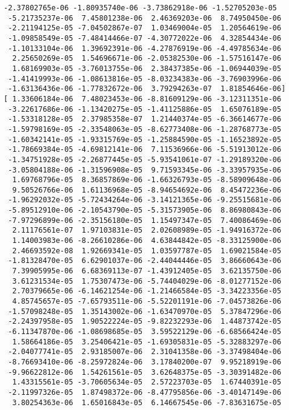 \documentclass[11pt]{article}
\begin{document}
\begin{Verbatim}[commandchars=\\\{\}]
 -2.37802765e-06 -1.80935740e-06 -3.73862918e-06 -1.52705203e-05
 -5.21735237e-06  7.45801238e-06  2.46369203e-06  8.74950450e-06
 -2.21194125e-05 -7.04502867e-07  1.03469004e-05  1.20564619e-06
 -1.09858549e-05 -7.48414466e-07 -4.30772022e-06  4.32854434e-06
 -1.10133104e-06  1.39692391e-06 -4.27876919e-06 -4.49785634e-06
  2.25650269e-05  1.54696671e-06 -2.05382530e-06 -1.57516147e-06
  1.68169903e-05 -3.76013755e-06  2.38437385e-06 -1.06944039e-05
 -1.41419993e-06 -1.08613816e-05 -8.03234383e-06 -3.76903996e-06
 -1.63136436e-06 -1.77832672e-06  3.79294263e-07  1.81854646e-06]
[ 1.33606184e-06  7.48023453e-06 -8.81609129e-06 -3.12311351e-06
 -3.22617686e-06 -1.13420275e-05 -1.41125886e-05  1.65076189e-05
 -1.53318128e-05  2.37985358e-07  1.21440374e-05 -6.36614677e-06
 -1.59798169e-05 -2.33548063e-05 -8.62773408e-06 -1.28768773e-05
 -1.60342141e-05 -1.93315769e-05 -1.25884590e-05 -1.16523892e-05
 -1.78669384e-05 -4.69812141e-06  7.11536966e-06 -5.51913012e-06
 -1.34751928e-05 -2.26877445e-05 -5.93541061e-07 -1.29189320e-06
 -3.05804188e-06 -1.31596908e-05  9.71593345e-06 -3.33957935e-06
  1.69768796e-05  8.36857869e-06 -1.66326793e-05 -8.58909648e-06
  9.50526766e-06  1.61136968e-05 -8.94654692e-06  8.45472236e-06
 -1.96292032e-05 -5.72434264e-06 -3.14121365e-06 -9.25515681e-06
 -5.89512910e-06 -2.10543790e-05 -5.31573905e-06  8.86980843e-06
 -7.97296899e-06 -2.35156180e-05  1.15497347e-05  7.40086469e-06
  2.11176561e-07  1.97103831e-05  2.02608989e-05 -1.94916372e-06
  1.14003983e-06 -8.26610286e-06  4.63844842e-05 -8.33125900e-06
  2.46693592e-08  1.92669341e-05  1.03597787e-05  1.69021584e-05
 -1.81328470e-05  6.62901037e-06 -2.44044446e-05  3.86660643e-06
  7.39905995e-06  6.68369113e-07 -1.43912405e-05  3.62135750e-06
  3.61231534e-05  1.75307473e-06 -5.74404029e-06 -8.01277152e-06
  2.70379665e-06 -6.14621254e-06 -1.21466584e-05 -3.34223356e-05
  4.85745657e-05 -7.65793511e-06 -5.52201191e-06 -7.04573826e-06
 -1.57098248e-05  1.35143002e-06 -1.63470970e-05  5.37847296e-06
 -2.24397958e-05  1.90522224e-05 -9.82232293e-06  1.44873742e-05
 -6.11347870e-06 -1.08698685e-05  3.59522129e-06 -6.68566424e-05
  1.58664186e-05  3.25406421e-05 -1.69305831e-05 -5.32883297e-06
 -2.04077741e-05  2.93185007e-06  2.31041358e-06 -3.37498404e-06
 -8.76693410e-06 -8.25972824e-06  3.17840200e-07  9.95218919e-06
 -9.96622812e-06  1.54261561e-05  3.62648375e-05 -3.30391482e-06
  1.43315561e-05 -3.70605634e-05  2.57223703e-05  1.67440391e-05
 -2.11997326e-05  1.87498372e-06 -8.47795856e-06 -3.40147149e-06
  3.80254363e-06  1.65016843e-05  6.14667545e-06 -7.83631675e-05

\end{Verbatim}
\end{document}
